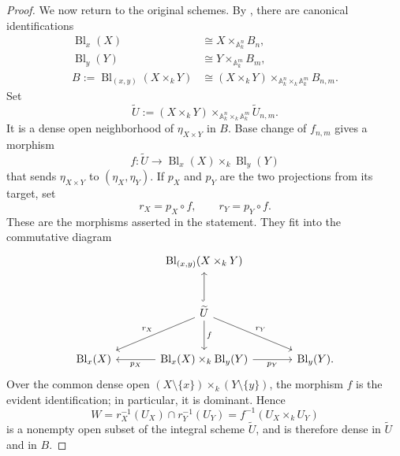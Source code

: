 \begin{proof}
We now return to the original schemes. By
, there are canonical identifications
\[
\begin{aligned}
\operatorname{Bl}_x(X)&\cong X\times_{\mathbb A_k^n} B_n,\\
\operatorname{Bl}_y(Y)&\cong Y\times_{\mathbb A_k^m} B_m,\\
B:=\operatorname{Bl}_{(x,y)}(X\times_kY)
  &\cong (X\times_kY)
      \times_{\mathbb A_k^n\times_k\mathbb A_k^m}B_{n,m}.
\end{aligned}
\]
Set
\[
    \widetilde U
      :=(X\times_kY)
        \times_{\mathbb A_k^n\times_k\mathbb A_k^m}\widetilde U_{n,m}.
\]
It is a dense open neighborhood of $\eta_{X\times Y}$ in $B$. Base change of
$f_{n,m}$ gives a morphism
\[
    f:\widetilde U\longrightarrow
      \operatorname{Bl}_x(X)\times_k\operatorname{Bl}_y(Y)
\]
that sends $\eta_{X\times Y}$ to $(\eta_X,\eta_Y)$. If $p_X$ and $p_Y$ are
the two projections from its target, set
\[
    r_X=p_X\circ f,
    \qquad
    r_Y=p_Y\circ f.
\]
These are the morphisms asserted in the statement. They fit into the
commutative diagram
\[
\begin{tikzcd}[column sep=large,row sep=large]
& \operatorname{Bl}_{(x,y)}(X\times_kY) & \\
& \widetilde U
    \arrow[u,hook] \arrow[dl,"r_X"'] \arrow[d,"f"] \arrow[dr,"r_Y"] & \\
\operatorname{Bl}_x(X)
& \operatorname{Bl}_x(X)\times_k\operatorname{Bl}_y(Y)
    \arrow[l,"p_X"] \arrow[r,"p_Y"']
& \operatorname{Bl}_y(Y).
\end{tikzcd}
\]
Over the common dense
open $(X\setminus\{x\})\times_k(Y\setminus\{y\})$, the morphism $f$ is the
evident identification; in particular, it is dominant. Hence
\[
    W=r_X^{-1}(U_X)\cap r_Y^{-1}(U_Y)
      =f^{-1}(U_X\times_k U_Y)
\]
is a nonempty open subset of the integral scheme $\widetilde U$, and is
therefore dense in $\widetilde U$ and in $B$.


\end{proof}

